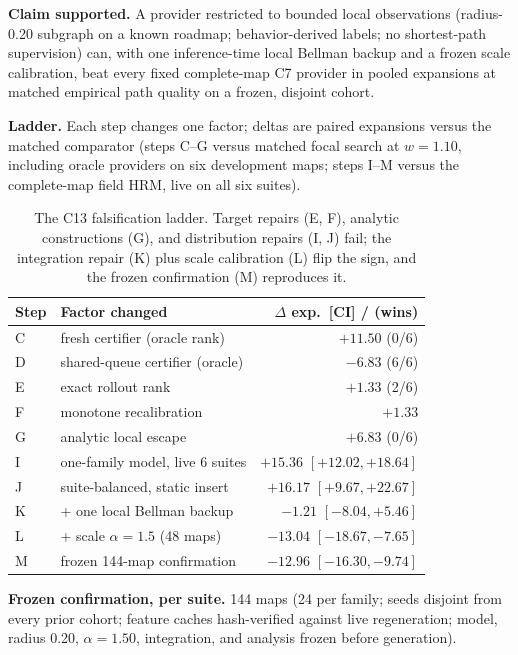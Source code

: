 \documentclass[letterpaper]{article} %
\newcommand{\stage}[1]{\textsc{#1}}
\begin{document}
\textbf{Claim supported.} A provider restricted to bounded local observations (radius-0.20 subgraph on a known roadmap; behavior-derived labels; no shortest-path supervision) can, with one inference-time local Bellman backup and a frozen scale calibration, beat every fixed complete-map \stage{C7} provider in pooled expansions at matched empirical path quality on a frozen, disjoint cohort.

\textbf{Ladder.} Each step changes one factor; deltas are paired expansions versus the matched comparator (steps C--G versus matched focal search at $w{=}1.10$, including oracle providers on six development maps; steps I--M versus the complete-map field HRM, live on all six suites).

\begin{table}[t]
\centering
\small
\setlength{\tabcolsep}{1.5pt}
\begin{tabular}{@{}llr@{}}
\toprule
Step & Factor changed & $\Delta$ exp.\ [CI] / (wins) \\
\midrule
C & fresh certifier (oracle rank) & $+11.50$ (0/6) \\
D & shared-queue certifier (oracle) & $-6.83$ (6/6) \\
E & exact rollout rank & $+1.33$ (2/6) \\
F & monotone recalibration & $+1.33$ \\
G & analytic local escape & $+6.83$ (0/6) \\
I & one-family model, live 6 suites & $+15.36$ $[+12.02,+18.64]$ \\
J & suite-balanced, static insert & $+16.17$ $[+9.67,+22.67]$ \\
K & + one local Bellman backup & $-1.21$ $[-8.04,+5.46]$ \\
L & + scale $\alpha{=}1.5$ (48 maps) & $-13.04$ $[-18.67,-7.65]$ \\
M & frozen 144-map confirmation & $-12.96$ $[-16.30,-9.74]$ \\
\bottomrule
\end{tabular}
\caption{The \stage{C13} falsification ladder. Target repairs (E, F), analytic constructions (G), and distribution repairs (I, J) fail; the integration repair (K) plus scale calibration (L) flip the sign, and the frozen confirmation (M) reproduces it.}
\label{tab:c13ladder}
\end{table}

\textbf{Frozen confirmation, per suite.} 144 maps (24 per family; seeds disjoint from every prior cohort; feature caches hash-verified against live regeneration; model, radius 0.20, $\alpha{=}1.50$, integration, and analysis frozen before generation).
\end{document}

